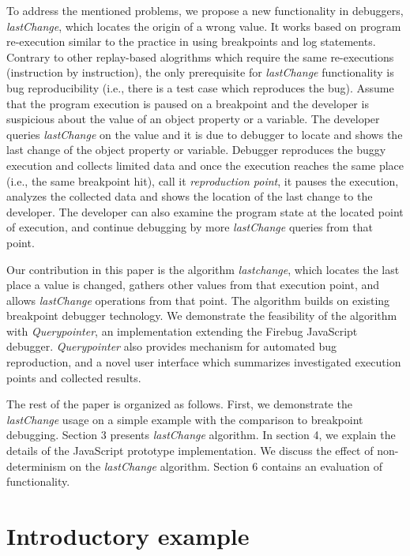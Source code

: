 \documentclass[preprint]{sigplanconf}
\begin{document}
To address the mentioned problems, we propose a new functionality in debuggers, \textit{lastChange}, which locates the origin of a wrong value. It works based on program re-execution similar to the practice in using breakpoints and log statements. Contrary to other replay-based alogrithms which require the same re-executions (instruction by instruction), the only prerequisite for \textit{lastChange} functionality is bug reproducibility (i.e., there is a test case which reproduces the bug). Assume that the program execution is paused on a breakpoint and the developer is suspicious about the value of an object property or a variable. The developer queries \textit{lastChange} on the value and it is due to debugger to locate and shows the last change of the object property or variable. Debugger reproduces the buggy execution and collects limited data and once the execution reaches the same place (i.e., the same breakpoint hit), call it \textit{reproduction point}, it pauses the execution, analyzes the collected data and shows the location of the last change to the developer. The developer can also examine the program state at the located point of execution, and continue debugging by more \textit{lastChange} queries from that point.

Our contribution in this paper is the algorithm \textit{lastchange}, which locates the last place a value is changed, gathers other values from that execution point, and allows \textit{lastChange} operations from that point. The algorithm builds on existing breakpoint debugger technology. We demonstrate the feasibility of the algorithm with \textit{Querypointer}, an implementation extending the Firebug JavaScript debugger. \textit{Querypointer} also provides mechanism for automated bug reproduction, and a novel user interface which summarizes investigated execution points and collected results. 

The rest of the paper is organized as follows. First, we demonstrate the \textit{lastChange} usage on a simple example with the comparison to breakpoint debugging. Section 3 presents \textit{lastChange} algorithm. In section 4, we explain the details of the JavaScript prototype implementation. We discuss the effect of non-determinism on the \textit{lastChange} algorithm. Section 6 contains an evaluation of  functionality. 

\section{Introductory example}
\end{document}
